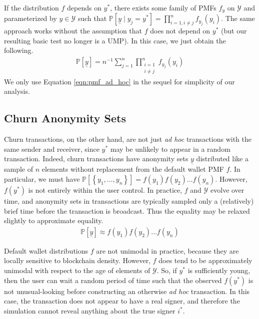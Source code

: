 \documentclass{tran-l}
\theoremstyle{cor}
\theoremstyle{definition}
\theoremstyle{remark}
\theoremstyle{conjecture}
\numberwithin{equation}{section}
\begin{document}
If the distribution $f$ depends on $y^*$, there exists some family of PMFs $f_{y}$ on $\mathcal{Y}$ and parameterized by $y \in \mathcal{Y}$ such that $\mathbb{P}[\underline{y} \mid y_j = y^*] = \prod_{i=1, i \neq j}^n f_{y_j}(y_i)$. The same approach works without the assumption that $f$ does not depend on $y^*$ (but our resulting basic test no longer is a UMP).
In this case, we just obtain the following.
\begin{align}\mathbb{P}[\underline{y}] = n^{-1} \sum_{j=1}^{n} \prod_{\substack{i=1 \\ i \neq j}}^n f_{y_j}(y_i)\end{align}
We only use Equation \ref{eqn:pmf_ad_hoc} in the sequel for simplicity of our analysis.

\subsection{Churn Anonymity Sets}\label{sec:basic_test_churn_transactions}

Churn transactions, on the other hand, are not just \textit{ad hoc} transactions with the same sender and receiver, since $y^*$ may be unlikely to appear in a random transaction.
Indeed, churn transactions have anonymity sets $\underline{y}$ distributed like a sample of $n$ elements without replacement from the default wallet PMF $f$.
In particular, we must have $\mathbb{P}\left[\left\{y_1, \ldots, y_n\right\}\right] = f(y_1)f(y_2) \ldots f(y_n)$.
However, $f(y^*)$ is not entirely within the user control.
In practice, $f$ and $\mathcal{Y}$ evolve over time, and anonymity sets in transactions are typically sampled only a (relatively) brief time before the transaction is broadcast. Thus the equality may be relaxed slightly to approximate equality.
\begin{align}
\mathbb{P}\left[\underline{y}\right] \approx f(y_1)f(y_2) \ldots f(y_n) \label{eqn:pmf_churn}
\end{align}

Default wallet distributions $f$ are not unimodal in practice, because they are locally sensitive to blockchain density. However, $f$ does tend to be approximately unimodal with respect to the age of elements of $\mathcal{Y}$.
So, if $y^*$ is sufficiently young, then the user can wait a random period of time such that the observed $f(y^*)$ is not unusual-looking before constructing an otherwise \textit{ad hoc} transaction.
In this case, the transaction does not appear to have a real signer, and therefore the simulation cannot reveal anything about the true signer $i^*$.
\end{document}
